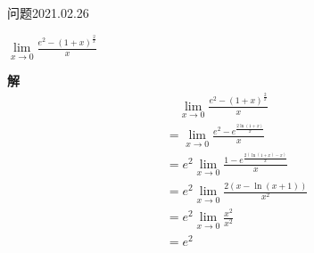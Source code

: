 \begin{mybox}{问题2021.02.26}
	
	\qquad $\lim\limits_{x\to 0}\frac{e^2-(1+x)^{\frac{2}{x}}}{x}$
\end{mybox}
\noindent
\textbf{解}
\begin{align*}
	&\quad\lim\limits_{x\to 0}\frac{e^2-(1+x)^{\frac{2}{x}}}{x}\\
	&=\lim \limits_{x \to 0} \frac{e^2-e^{\frac{2\ln (1+x)}{x}}}{x}\\
	&=e^2 \lim\limits_{x\to 0}\frac{1-e^{\frac{2(\ln(1+x) -x)}{x}}}{x}\\
	&=e^2\lim\limits_{x \to 0} \frac{2(x-\ln (x+1))}{x^2}\\
	&=e^2\lim\limits_{x \to 0} \frac{x^2}{x^2}\\
	&=e^2
\end{align*}